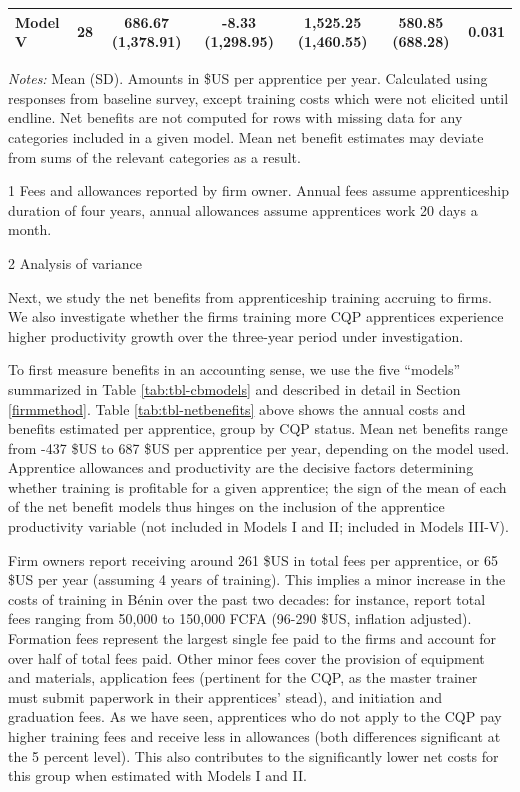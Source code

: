 \documentclass[
  a4paper, twoside, 12pt]{book}
\begin{document}
\begin{table}[H]
{\begin{threeparttable}
\begin{tabular}[t]{lcccccc}
\hspace{1em}Model V & 28 & 686.67 (1,378.91) & -8.33 (1,298.95) & 1,525.25 (1,460.55) & 580.85 (688.28) & 0.031\\
\bottomrule
\end{tabular}
\begin{tablenotes}
\small
\item \textit{Notes:} Mean (SD). Amounts in \$US per apprentice per year. Calculated using responses from baseline survey, except training costs which were not elicited until endline. Net benefits are not computed for rows with missing data for any categories included in a given model. Mean net benefit estimates may deviate from sums of the relevant categories as a result.
\item[1] Fees and allowances reported by firm owner. Annual fees assume apprenticeship duration of four years, annual allowances assume apprentices work 20 days a month.
\item[2] Analysis of variance
\end{tablenotes}
\end{threeparttable}}
\end{table}

Next, we study the net benefits from apprenticeship training accruing to firms. We also investigate whether the firms training more CQP apprentices experience higher productivity growth over the three-year period under investigation.

To first measure benefits in an accounting sense, we use the five ``models'' summarized in Table \ref{tab:tbl-cbmodels} and described in detail in Section \ref{firmmethod}. Table \ref{tab:tbl-netbenefits} above shows the annual costs and benefits estimated per apprentice, group by CQP status. Mean net benefits range from -437 \$US to 687 \$US per apprentice per year, depending on the model used. Apprentice allowances and productivity are the decisive factors determining whether training is profitable for a given apprentice; the sign of the mean of each of the net benefit models thus hinges on the inclusion of the apprentice productivity variable (not included in Models I and II; included in Models III-V).

Firm owners report receiving around 261 \$US in total fees per apprentice, or 65 \$US per year (assuming 4 years of training). This implies a minor increase in the costs of training in Bénin over the past two decades: for instance, \textcite{walther2007} report total fees ranging from 50,000 to 150,000 FCFA (96-290 \$US, inflation adjusted). Formation fees represent the largest single fee paid to the firms and account for over half of total fees paid. Other minor fees cover the provision of equipment and materials, application fees (pertinent for the CQP, as the master trainer must submit paperwork in their apprentices' stead), and initiation and graduation fees. As we have seen, apprentices who do not apply to the CQP pay higher training fees and receive less in allowances (both differences significant at the 5 percent level). This also contributes to the significantly lower net costs for this group when estimated with Models I and II.
\end{document}
